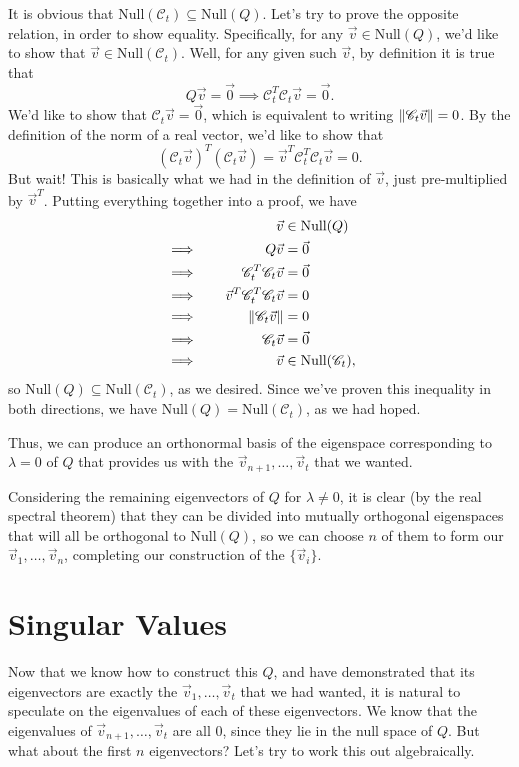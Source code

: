 \documentclass[letterpaper]{article}
\theoremstyle{remark}
\newcommand{\Null}[1]{\text{Null}(#1)}
\newcommand{\eqn}[1]{\begin{alignat*}{2}#1\end{alignat*}}
\newcommand*{\thus}{&\implies\quad&}
\begin{document}
It is obvious that $\Null{\mathscr{C}_t} \subseteq \Null{Q}$. Let's try to prove the opposite relation, in order to show equality. Specifically, for any $\vec{v} \in \Null{Q}$, we'd like to show that $\vec{v} \in \Null{\mathscr{C}_t}$. Well, for any given such $\vec{v}$, by definition it is true that
\[
    Q\vec{v} = \vec{0} \implies \mathscr{C}_t^T\mathscr{C}_t\vec{v} = \vec{0}.
\]
We'd like to show that $\mathscr{C}_t\vec{v} = \vec{0}$, which is equivalent to writing $\norm{\mathscr{C}_t\vec{v}} = 0$. By the definition of the norm of a real vector, we'd like to show that
\[
    (\mathscr{C}_t\vec{v})^T(\mathscr{C}_t\vec{v}) = \vec{v}^T\mathscr{C}_t^T\mathscr{C}_t\vec{v} = 0.
\]
But wait! This is basically what we had in the definition of $\vec{v}$, just pre-multiplied by $\vec{v}^T$. Putting everything together into a proof, we have
\eqn{
    && \vec{v} &\in \Null{Q} \\
    \thus Q\vec{v} &= \vec{0} \\
    \thus \mathscr{C}_t^T\mathscr{C}_t\vec{v} &= \vec{0} \\
    \thus \vec{v}^T\mathscr{C}_t^T\mathscr{C}_t\vec{v} &= 0 \\
    \thus \norm{\mathscr{C}_t\vec{v}} &= 0 \\
    \thus \mathscr{C}_t\vec{v} &= \vec{0} \\
    \thus \vec{v} &\in \Null{\mathscr{C}_t},
}
so $\Null{Q} \subseteq \Null{\mathscr{C}_t}$, as we desired. Since we've proven this inequality in both directions, we have $\Null{Q} = \Null{\mathscr{C}_t}$, as we had hoped.

Thus, we can produce an orthonormal basis of the eigenspace corresponding to $\lambda = 0$ of $Q$ that provides us with the $\vec{v}_{n+1}, \ldots, \vec{v}_t$ that we wanted.

Considering the remaining eigenvectors of $Q$ for $\lambda \ne 0$, it is clear (by the real spectral theorem) that they can be divided into mutually orthogonal eigenspaces that will all be orthogonal to $\Null{Q}$, so we can choose $n$ of them to form our $\vec{v}_1, \ldots, \vec{v}_n$, completing our construction of the $\{ \vec{v}_i \}$.

\section{Singular Values}
Now that we know how to construct this $Q$, and have demonstrated that its eigenvectors are exactly the $\vec{v}_1, \ldots, \vec{v}_t$ that we had wanted, it is natural to speculate on the eigenvalues of each of these eigenvectors. We know that the eigenvalues of $\vec{v}_{n + 1}, \ldots, \vec{v}_t$ are all $0$, since they lie in the null space of $Q$. But what about the first $n$ eigenvectors? Let's try to work this out algebraically. 
\end{document}
